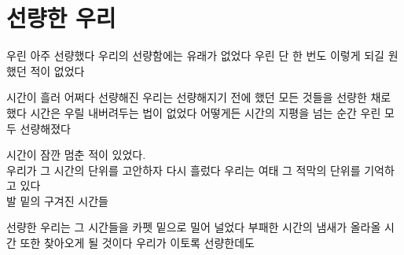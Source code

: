 \hypertarget{uxc120uxb7c9uxd55c-uxc6b0uxb9ac}{%

\chapter{선량한 우리}\label{uxc120uxb7c9uxd55c-uxc6b0uxb9ac}}



우린 아주 선량했다 우리의 선량함에는 유래가 없었다 우린 단 한 번도 이렇게 되길 원했던 적이 없었다



시간이 흘러 어쩌다 선량해진 우리는 선량해지기 전에 했던 모든 것들을 선량한 채로 했다 시간은 우릴 내버려두는 법이 없었다 어떻게든 시간의 지평을 넘는 순간 우린 모두 선량해졌다



시간이 잠깐 멈춘 적이 있었다.\\

우리가 그 시간의 단위를 고안하자 다시 흘렀다 우리는 여태 그 적막의 단위를 기억하고 있다\\

발 밑의 구겨진 시간들



선량한 우리는 그 시간들을 카펫 밑으로 밀어 널었다 부패한 시간의 냄새가 올라올 시간 또한 찾아오게 될 것이다 우리가 이토록 선량한데도

